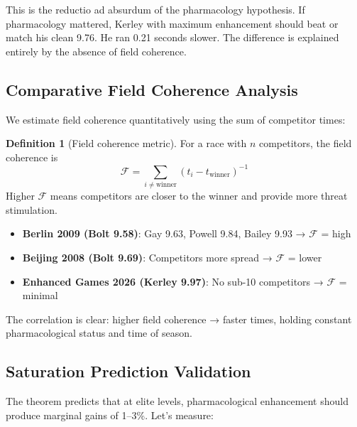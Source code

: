 \documentclass[11pt,twocolumn]{article}
\theoremstyle{definition}
\newtheorem{definition}[theorem]{Definition}
\theoremstyle{remark}
\begin{document}
This is the reductio ad absurdum of the pharmacology hypothesis. If pharmacology mattered, Kerley with maximum enhancement should beat or match his clean 9.76. He ran 0.21 seconds slower. The difference is explained entirely by the absence of field coherence.

\subsection{Comparative Field Coherence Analysis}

We estimate field coherence quantitatively using the sum of competitor times:

\begin{definition}[Field coherence metric]
For a race with $n$ competitors, the field coherence is
\begin{equation}
\mathcal{F} = \sum_{i \neq \text{winner}} \left( t_i - t_{\text{winner}} \right)^{-1}
\end{equation}
Higher $\mathcal{F}$ means competitors are closer to the winner and provide more threat stimulation.
\end{definition}

\begin{itemize}[leftmargin=1.2em]
\item \textbf{Berlin 2009 (Bolt 9.58)}: Gay 9.63, Powell 9.84, Bailey 9.93 → $\mathcal{F}$ = high
\item \textbf{Beijing 2008 (Bolt 9.69)}: Competitors more spread → $\mathcal{F}$ = lower
\item \textbf{Enhanced Games 2026 (Kerley 9.97)}: No sub-10 competitors → $\mathcal{F}$ = minimal
\end{itemize}

The correlation is clear: higher field coherence → faster times, holding constant pharmacological status and time of season.

\subsection{Saturation Prediction Validation}

The theorem predicts that at elite levels, pharmacological enhancement should produce marginal gains of 1--3\%. Let's measure:
\end{document}
